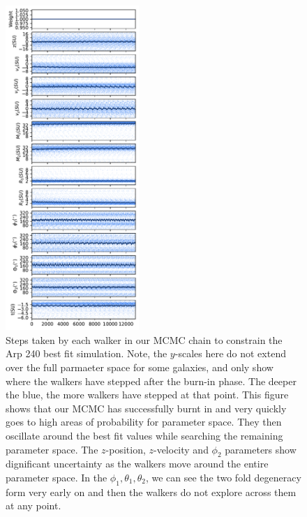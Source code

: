 \begin{figure}
    \centering
    \includegraphics[width=0.45\textwidth]{Chapter1/figures/arp-240-steps.pdf}
    \caption{Steps taken by each walker in our MCMC chain to constrain the Arp 240 best fit simulation. Note, the $y$-scales here do not extend over the full parmaeter space for some galaxies, and only show where the walkers have stepped after the burn-in phase. The deeper the blue, the more walkers have stepped at that point. This figure shows that our MCMC has successfully burnt in and very quickly goes to high areas of probability for parameter space. They then oscillate around the best fit values while searching the remaining parameter space. The $z$-position, $z$-velocity and $\phi_{2}$ parameters show dignificant uncertainty as the walkers move around the entire parameter space. In the $\phi_{1}, \theta_{1}, \theta_{2}$, we can see the two fold degeneracy form very early on and then the walkers do not explore across them at any point.}
    \label{fig:walker_steps}
\end{figure}


